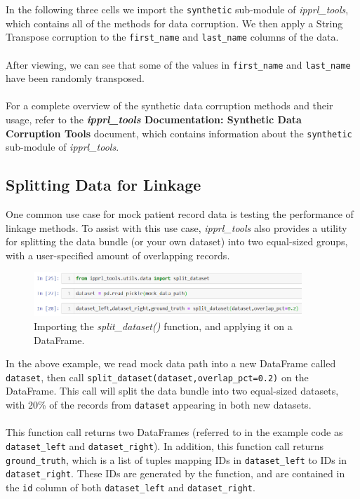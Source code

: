 \documentclass[titlepage, 11pt]{article}
\newcommand{\pkgname}{\textit{ipprl\_tools}}
\begin{document}
\noindent In the following three cells we import the \verb|synthetic| sub-module of \pkgname{}, which contains all of the methods for data corruption.
We then apply a String Transpose corruption to the \verb|first_name| and \verb|last_name| columns of the data. 
\\
\\
\noindent After viewing, we can see that some of the values in \verb|first_name| and \verb|last_name| have been randomly transposed. 
\\
\\
\noindent For a complete overview of the synthetic data corruption methods and their usage, refer to the \textbf{\pkgname{} Documentation: Synthetic Data Corruption Tools} document, which contains information about the \verb|synthetic| sub-module of \pkgname.

\subsection{Splitting Data for Linkage}
One common use case for mock patient record data is testing the performance of linkage methods. To assist with this use case, \pkgname{} also provides a utility for splitting the data bundle (or your own dataset) into two equal-sized groups, with a user-specified amount of overlapping records.

\begin{figure}[H]
    \centering
    \includegraphics[width=0.9\textwidth]{imgs/mock_data4.PNG}
    \caption{Importing the \textit{split\_dataset()} function, and applying it on a DataFrame.}
    \label{fig:datasplit}
\end{figure}

\noindent In the above example, we read mock data path into a new DataFrame called \verb|dataset|, then call \verb|split_dataset(dataset,overlap_pct=0.2)| on the DataFrame. This call will split the data bundle into two equal-sized datasets, with 20\% of the records from \verb|dataset| appearing in both new datasets.
\\
\\
\noindent This function call returns two DataFrames (referred to in the example code as \verb|dataset_left| and \verb|dataset_right|). In addition, this function call returns \verb|ground_truth|, which is a list of tuples mapping IDs in \verb|dataset_left| to IDs in \verb|dataset_right|. These IDs are generated by the function, and are contained in the \verb|id| column of both \verb|dataset_left| and \verb|dataset_right|.
\end{document}
